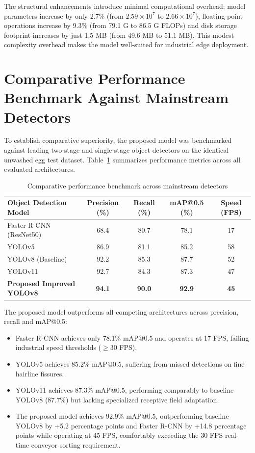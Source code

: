 \documentclass[12pt,a4paper]{report}
\begin{document}
The structural enhancements introduce minimal computational overhead: model parameters increase by only 2.7\% (from $2.59 \times 10^7$ to $2.66 \times 10^7$), floating-point operations increase by 9.3\% (from 79.1 G to 86.5 G FLOPs) and disk storage footprint increases by just 1.5 MB (from 49.6 MB to 51.1 MB). This modest complexity overhead makes the model well-suited for industrial edge deployment.

\section{Comparative Performance Benchmark Against Mainstream Detectors}

To establish comparative superiority, the proposed model was benchmarked against leading two-stage and single-stage object detectors on the identical unwashed egg test dataset. Table~\ref{tab:benchmark_comparison} summarizes performance metrics across all evaluated architectures.

\begin{table}[H]
\centering
\caption{Comparative performance benchmark across mainstream detectors}
\label{tab:benchmark_comparison}
\vspace{0.2cm}
\setlength{\tabcolsep}{8pt}
\renewcommand{\arraystretch}{1.15}
\small
\begin{tabular}{|l|c|c|c|c|}
\hline
\textbf{Object Detection Model} & \textbf{Precision (\%)} & \textbf{Recall (\%)} & \textbf{mAP@0.5 (\%)} & \textbf{Speed (FPS)} \\
\hline
Faster R-CNN (ResNet50) & 68.4 & 80.7 & 78.1 & 17 \\
\hline
YOLOv5 & 86.9 & 81.1 & 85.2 & 58 \\
\hline
YOLOv8 (Baseline) & 92.2 & 85.3 & 87.7 & 52 \\
\hline
YOLOv11 & 92.7 & 84.3 & 87.3 & 47 \\
\hline
\textbf{Proposed Improved YOLOv8} & \textbf{94.1} & \textbf{90.0} & \textbf{92.9} & \textbf{45} \\
\hline
\end{tabular}
\end{table}

The proposed model outperforms all competing architectures across precision, recall and mAP@0.5:
\begin{itemize}
    \item Faster R-CNN achieves only 78.1\% mAP@0.5 and operates at 17 FPS, failing industrial speed thresholds ($\ge 30$ FPS).
    \item YOLOv5 achieves 85.2\% mAP@0.5, suffering from missed detections on fine hairline fissures.
    \item YOLOv11 achieves 87.3\% mAP@0.5, performing comparably to baseline YOLOv8 (87.7\%) but lacking specialized receptive field adaptation.
    \item The proposed model achieves 92.9\% mAP@0.5, outperforming baseline YOLOv8 by +5.2 percentage points and Faster R-CNN by +14.8 percentage points while operating at 45 FPS, comfortably exceeding the 30 FPS real-time conveyor sorting requirement.
\end{itemize}
\end{document}
